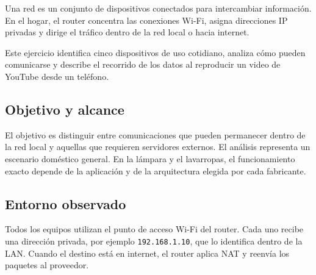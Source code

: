 \documentclass[11pt,a4paper]{article}
\begin{document}
Una red es un conjunto de dispositivos conectados para intercambiar información. En el hogar, el router concentra las conexiones Wi-Fi, asigna direcciones IP privadas y dirige el tráfico dentro de la red local o hacia internet.

Este ejercicio identifica cinco dispositivos de uso cotidiano, analiza cómo pueden comunicarse y describe el recorrido de los datos al reproducir un video de YouTube desde un teléfono.

\subsection*{Objetivo y alcance}

El objetivo es distinguir entre comunicaciones que pueden permanecer dentro de la red local y aquellas que requieren servidores externos. El análisis representa un escenario doméstico general. En la lámpara y el lavarropas, el funcionamiento exacto depende de la aplicación y de la arquitectura elegida por cada fabricante.

\subsection*{Entorno observado}

Todos los equipos utilizan el punto de acceso Wi-Fi del router. Cada uno recibe una dirección privada, por ejemplo \texttt{192.168.1.10}, que lo identifica dentro de la LAN. Cuando el destino está en internet, el router aplica NAT y reenvía los paquetes al proveedor.

\begin{center}
\end{center}
\end{document}
